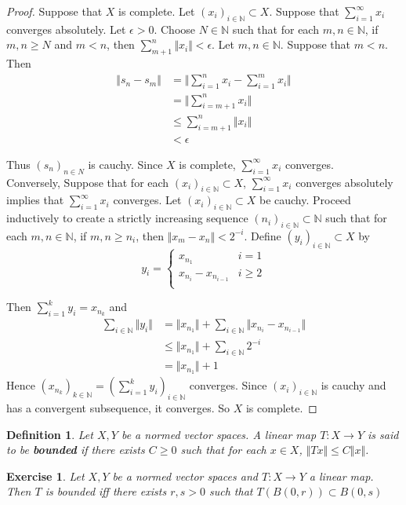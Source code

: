 \documentclass[12pt]{amsart}
\newtheorem{defn}[thm]{Definition}
\newtheorem{ex}[thm]{Exercise}
\newcommand{\ep}{\epsilon}
\newcommand{\N}{\mathbb{N}}
\newcommand{\seq}[1]{(x_{#1})_{#1 \in \N}}
\newcommand{\n}{\Vert}
\begin{document}
\begin{proof}
Suppose that $X$ is complete. Let $\seq{i} \subset X$. Suppose that $\sum_{i=1}^{\infty}x_i$ converges absolutely. Let $\ep >0$. Choose $N \in \N$ such that for each $m,n \in \N$, if $m, n \geq N$ and $m< n$, then $\sum_{m+1}^n \n x_i \n < \ep$. Let $m, n \in \N$. Suppose that $m<n$. Then 
\begin{align*}
\n s_n-s_m \n 
&= \bigg \n \sum_{i=1}^n x_i -\sum_{i=1}^m x_i\bigg \n \\
&= \bigg\n \sum_{i=m+1}^{n} x_i \bigg\n\\
& \leq \sum_{i=m+1}^n \n x_i \n \\
& < \ep
\end{align*}

Thus $(s_n)_{n \in N}$ is cauchy. Since $X$ is complete, $\sum_{i=1}^{\infty}x_i$ converges. \\
Conversely, Suppose that for each $\seq{i} \subset X$, $\sum_{i =1}^{\infty}x_i$ converges absolutely implies that $\sum_{i=1}^{\infty}x_i$ converges. Let $\seq{i} \subset X$ be cauchy. Proceed inductively to create a strictly increasing sequence $(n_i)_{i \in \N} \subset \N$ such that for each $m, n \in \N$, if $m,n \geq n_i$, then $ \n x_m-x_n \n < 2^{-i}$. Define $(y_i)_{i \in \N} \subset X$ by 
\[ y_i = \begin{cases}
x_{n_1} & i=1 \\
x_{n_i} - x_{n_{i-1}} & i \geq 2\\
\end{cases}\]

Then $\sum_{i=1}^k y_i = x_{n_k}$ and 
\begin{align*}
\sum_{i \in \N} \n y_i \n 
&= \n x_{n_1} \n+ \sum_{i \in \N} \n x_{n_i}-x_{n_{i-1}} \n \\
& \leq \n x_{n_1} \n + \sum_{i \in \N}2^{-i}\\
& = \n x_{n_1} \n +1
\end{align*}
Hence $(x_{n_k})_{k \in \N} = (\sum_{i=1}^k y_i)_{i\in \N}$ converges. Since $(x_i)_{i \in \N}$ is cauchy and has a convergent subsequence, it converges. So $X$ is complete.
\end{proof}

\begin{defn}
Let $X,Y$ be a normed vector spaces. A linear map $T:X \rightarrow Y$ is said to be \textbf{bounded} if there exists $C \geq 0$ such that for each $x \in X$, $\n Tx \n \leq C \n x \n$.
\end{defn}

\begin{ex}
Let $X,Y$ be a normed vector spaces and $T:X \rightarrow Y$ a linear map. Then $T$ is bounded iff there exists $r,s>0$ such that $T(B(0,r)) \subset B(0,s)$
\end{ex}
\end{document}
